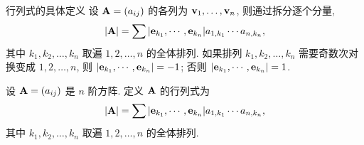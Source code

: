 

\begin{frame}{行列式的具体定义\noexer}
	\onslide<+->
	设 ${\mathbf{A}}=(a_{ij})$ 的各列为 ${\mathbf{v}}_1,\dots,{\mathbf{v}}_n$,
	\onslide<+->
	则通过拆分逐个分量,
	\[|{\mathbf{A}}|=\sum |{\mathbf{e}}_{k_1},\cdots,{\mathbf{e}}_{k_n}| a_{1,k_1}\cdots a_{n,k_n}, \]
	其中 $k_1,k_2,\dots,k_n$ 取遍 $1,2,\dots,n$ 的全体排列.
	\onslide<+->
	如果排列 $k_1,k_2,\dots,k_n$ 需要奇数次对换变成 $1,2,\dots,n$, 则 
	$|{\mathbf{e}}_{k_1},\cdots,{\mathbf{e}}_{k_n}|=-1$; 否则 $|{\mathbf{e}}_{k_1},\cdots,{\mathbf{e}}_{k_n}|=1$.
	\onslide<+->
	\begin{definition}
		设 ${\mathbf{A}}=(a_{ij})$ 是 $n$ 阶方阵.
		定义 ${\mathbf{A}}$ 的行列式为
		\[|{\mathbf{A}}|=\sum |{\mathbf{e}}_{k_1},\cdots,{\mathbf{e}}_{k_n}| a_{1,k_1}\cdots a_{n,k_n},\]
		其中 $k_1,k_2,\dots,k_n$ 取遍 $1,2,\dots,n$ 的全体排列.
	\end{definition}
\end{frame}


